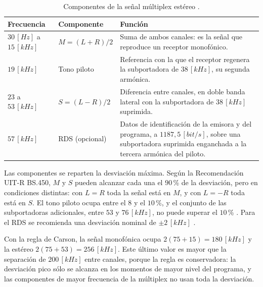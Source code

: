 \begin{table}[H]
    \centering
    \caption{Componentes de la señal múltiplex estéreo \cite{itu_bs450, itu_bs643}.}
    \label{tab:fm_multiplex}
    \renewcommand{\arraystretch}{1.3}
    \begin{tabular}{l l >{\raggedright\arraybackslash}p{7.6cm}}
        \toprule
        \textbf{Frecuencia} & \textbf{Componente} & \textbf{Función} \\
        \midrule
        $30 \, [Hz]$ a $15 \, [kHz]$ & $M = (L+R)/2$ & Suma de ambos canales: es la señal que reproduce un receptor monofónico. \\
        $19 \, [kHz]$ & Tono piloto & Referencia con la que el receptor regenera la subportadora de $38 \, [kHz]$, su segunda armónica. \\
        $23$ a $53 \, [kHz]$ & $S = (L-R)/2$ & Diferencia entre canales, en doble banda lateral con la subportadora de $38 \, [kHz]$ suprimida. \\
        $57 \, [kHz]$ & RDS (opcional) & Datos de identificación de la emisora y del programa, a $1187{,}5 \, [bit/s]$, sobre una subportadora suprimida enganchada a la tercera armónica del piloto. \\
        \bottomrule
    \end{tabular}
\end{table}

Las componentes se reparten la desviación máxima. Según la Recomendación UIT-R BS.450, $M$ y $S$ pueden alcanzar cada una el $90 \, $\% de la desviación, pero en condiciones distintas: con $L = R$ toda la señal está en $M$, y con $L = -R$ toda está en $S$. El tono piloto ocupa entre el $8$ y el $10 \, $\%, y el conjunto de las subportadoras adicionales, entre $53$ y $76 \, [kHz]$, no puede superar el $10 \, $\% \cite{itu_bs450}. Para el RDS se recomienda una desviación nominal de $\pm 2 \, [kHz]$ \cite{itu_bs643}.

Con la regla de Carson, la señal monofónica ocupa $2(75 + 15) = 180 \, [kHz]$ y la estéreo $2(75 + 53) = 256 \, [kHz]$. Este último valor es mayor que la separación de $200 \, [kHz]$ entre canales, porque la regla es conservadora: la desviación pico sólo se alcanza en los momentos de mayor nivel del programa, y las componentes de mayor frecuencia de la múltiplex no usan toda la desviación.

